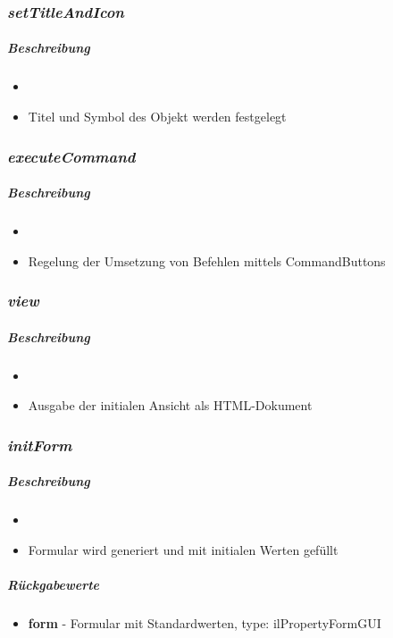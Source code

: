 \subsubsection*{\textit{setTitleAndIcon}}\label{setTitleAndIconMGUI}
\subparagraph{Beschreibung}
\begin{itemize}
	\item[] \noindent{} 
	\item[] Titel und Symbol des Objekt werden festgelegt
\end{itemize}

\subsubsection*{\textit{executeCommand}}\label{executeCommandMGUI}
\subparagraph{Beschreibung}
\begin{itemize}
	\item[] \noindent{} 
	\item[] Regelung der Umsetzung von Befehlen mittels CommandButtons
\end{itemize}

\subsubsection*{\textit{view}}\label{viewMGUI}
\subparagraph{Beschreibung}
\begin{itemize}
	\item[] \noindent{} 
	\item[] Ausgabe der initialen Ansicht als HTML-Dokument
\end{itemize}

\subsubsection*{\textit{initForm}}\label{initFormMGUI}
\subparagraph{Beschreibung}
\begin{itemize}
	\item[] \noindent{} 
	\item[] Formular wird generiert und mit initialen Werten gefüllt
\end{itemize}
\subparagraph{Rückgabewerte}
\begin{itemize}
\item[] \textbf{form} - Formular mit Standardwerten, type: ilPropertyFormGUI
\end{itemize}

